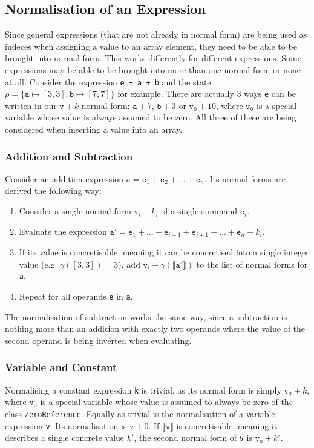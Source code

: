 \subsection{Normalisation of an Expression}\label{sec:expressions:normalisation}

Since general expressions (that are not already in normal form) are being used as indeces when assigning a value to an array element, they need to be able to be brought into normal form. This works differently for different expressions. Some expressions may be able to be brought into more than one normal form or none at all. Consider the expression \texttt{e = a + b} and the state $\rho=\{\mathtt{a}\mapsto[3,3], \mathtt{b}\mapsto[7,7]\}$ for example. There are actually 3 ways \texttt{e} can be written in our $\mathtt{v}+k$ normal form: $\mathtt{a}+7$, $\mathtt{b}+3$ or $\mathtt{v_0}+10$, where $\mathtt{v_0}$ is a special variable whose value is always assumed to be zero. All three of these are being considered when inserting a value into an array.

\subsubsection{Addition and Subtraction}


Consider an addition expression $\mathtt{a}=\mathtt{e}_1 + \mathtt{e}_2+\ldots+\mathtt{e}_n$. Its normal forms are derived the following way:


\begin{enumerate}
	\item Consider a single normal form $\mathtt{v}_i + k_i$ of a single summand $\mathtt{e}_i$.
	\item Evaluate the expression $\mathtt{a}'=\mathtt{e}_1 +\ldots+ \mathtt{e}_{i-1} + \mathtt{e}_{i+1} +\ldots+\mathtt{e}_n+k_i$.
	\item If its value is concretisable, meaning it can be concretised into a single integer value (e.g. $\gamma([3,3])=3$), add $\mathtt{v}_i+\gamma(\llbracket\mathtt{a}'\rrbracket)$ to the list of normal forms for \texttt{a}.
	\item Repeat for all operands \texttt{e} in \texttt{a}. 
\end{enumerate}

\noindent The normalisation of subtraction works the same way, since a subtraction is nothing more than an addition with exactly two operands where the value of the second operand is being inverted when evaluating.

\subsubsection{Variable and Constant}
Normalising a constant expression \texttt{k} is trivial, as its normal form is simply $\mathtt{v_0}+k$, where $\mathtt{v_0}$ is a special variable whose value is assumed to always be zero of the class \texttt{ZeroReference}. Equally as trivial is the normalisation of a variable expression \texttt{v}. Its normalisation is $\mathtt{v}+0$. If $\llbracket\mathtt{v}\rrbracket$ is concretisable, meaning it describes a single concrete value $k'$, the second normal form of \texttt{v} is $\mathtt{v_0}+k'$.


